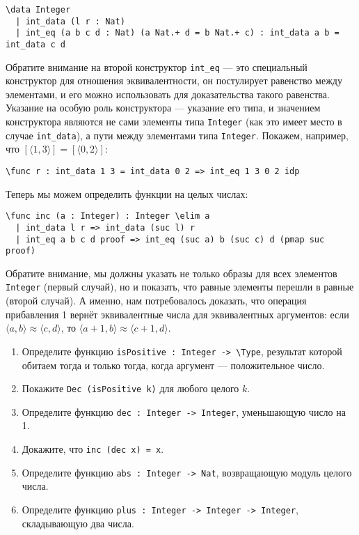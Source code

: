 \documentclass[10pt,a4paper,oneside]{article}
\begin{document}
\begin{enumerate}
\begin{verbatim}
\data Integer
  | int_data (l r : Nat)
  | int_eq (a b c d : Nat) (a Nat.+ d = b Nat.+ c) : int_data a b = int_data c d
\end{verbatim}

Обратите внимание на второй конструктор \verb!int_eq! --- это специальный конструктор для отношения эквивалентности,
он постулирует равенство между элементами, и его можно использовать для доказательства такого равенства.
Указание на особую роль конструктора --- указание его типа, и значением конструктора являются не сами элементы типа
\verb!Integer! (как это имеет место в случае \verb!int_data!), а пути между элементами типа \verb!Integer!.
Покажем, например, что $[\langle 1,3\rangle] = [\langle 0,2\rangle]$:

\begin{verbatim}
\func r : int_data 1 3 = int_data 0 2 => int_eq 1 3 0 2 idp
\end{verbatim}

Теперь мы можем определить функции на целых числах:

\begin{verbatim}
\func inc (a : Integer) : Integer \elim a
  | int_data l r => int_data (suc l) r
  | int_eq a b c d proof => int_eq (suc a) b (suc c) d (pmap suc proof)
\end{verbatim}

Обратите внимание, мы должны указать не только образы для всех элементов \verb!Integer! (первый случай), но и показать, что 
равные элементы перешли в равные (второй случай).
А именно, нам потребовалось доказать, что операция прибавления 1 вернёт эквивалентные числа для эквивалентных аргументов:
если $\langle a,b\rangle \approx \langle c,d\rangle$, то $\langle a+1, b\rangle \approx \langle c+1,d\rangle$.

\begin{enumerate}
\item Определите функцию \verb!isPositive : Integer -> \Type!, результат которой обитаем тогда и только тогда,
когда аргумент --- положительное число.
\item Покажите \verb!Dec (isPositive k)! для любого целого $k$.
\item Определите функцию \verb!dec : Integer -> Integer!, уменьшающую число на 1.
\item Докажите, что \verb!inc (dec x) = x!.
\item Определите функцию \verb!abs : Integer -> Nat!, возвращающую модуль целого числа.
\item Определите функцию \verb!plus : Integer -> Integer -> Integer!, складывающую два числа.
\end{enumerate}


\end{enumerate}
\end{document}
